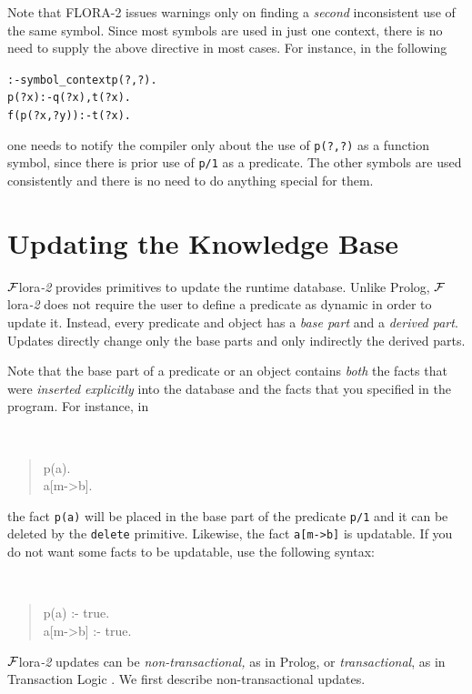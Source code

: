 \documentclass[11pt]{article}
\newcommand{\FLORA}{{\mbox{\sc ${\cal F}${lora}\rm\emph{-2}}}\xspace}
\begin{document}
Note that FLORA-2 issues warnings only on finding a \emph{second}
inconsistent use of the same symbol. Since most symbols are used in just
one context, there is no need to supply the above directive  
in most cases. For instance, in the following
\begin{alltt}
    :- symbol_context p(?,?).
    p(?x):-q(?x), t(?x).
    f(p(?x,?y)):-t(?x).
\end{alltt}
one needs to notify the compiler only about the use of \texttt{p(?,?)} as a
function symbol, since there is prior use of \texttt{p/1} as a predicate.
The other symbols are used consistently and there is no need to do anything
special for them.
\begin{alltt}
\end{alltt}


\section{Updating the Knowledge Base}\label{sec-updates}


%
\FLORA provides primitives to update the runtime database. Unlike Prolog,
\FLORA does not require the user to define a predicate as dynamic in order
to update it. Instead, every predicate and object
has a \emph{base part} and a \emph{derived part}.  Updates directly change
only the base parts and only indirectly the derived parts.

Note that the base part of a predicate or an object contains \emph{both}
the facts that were \emph{inserted explicitly} into the database and the
facts that you specified in the program. For instance, in
{\tt
\begin{quote}
 p(a).\\
 a[m->b].
\end{quote}
}
\noindent
the fact {\tt p(a)} will be placed in the base part of the
predicate {\tt p/1}  and it can be deleted by the {\tt delete}
primitive. Likewise, the fact {\tt a[m->b]} is updatable. If you do not
want some facts to be updatable, use the following syntax:
{\tt
\begin{quote}
 p(a) :- true.\\
 a[m->b] :- true.
\end{quote}
}


\FLORA updates can be \emph{non-transactional,} as in Prolog, or
\emph{transactional}, as in Transaction Logic
\cite{trans-chapter-98,trans-tcs94}.  We first describe non-transactional
updates.
\end{document}
